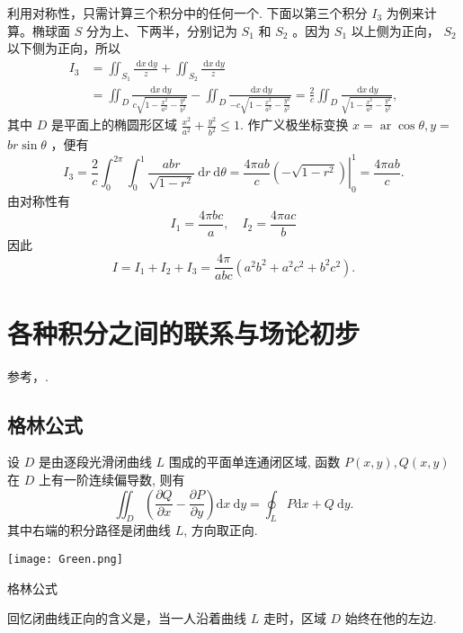 \begin{solution}
    利用对称性，只需计算三个积分中的任何一个. 下面以第三个积分 $I_3$ 为例来计算。椭球面 $S$ 分为上、下两半，分别记为 $S_1$ 和 $S_2$ 。因为 $S_1$ 以上侧为正向， $S_2$ 以下侧为正向，所以
$$
\begin{aligned}
I_3 & =\iint_{S_1} \frac{\mathrm{~d} x \mathrm{~d} y}{z}+\iint_{S_2} \frac{\mathrm{~d} x \mathrm{~d} y}{z} \\
& =\iint_D \frac{\mathrm{~d} x \mathrm{~d} y}{c \sqrt{1-\frac{x^2}{a^2}-\frac{y^2}{b^2}}}-\iint_D \frac{\mathrm{~d} x \mathrm{~d} y}{-c \sqrt{1-\frac{x^2}{a^2}-\frac{y^2}{b^2}}}=\frac{2}{c} \iint_D \frac{\mathrm{~d} x \mathrm{~d} y}{\sqrt{1-\frac{x^2}{a^2}-\frac{y^2}{b^2}}},
\end{aligned}
$$
其中 $D$ 是平面上的椭圆形区域 $\frac{x^2}{a^2}+\frac{y^2}{b^2} \leqslant 1$. 作广义极坐标变换 $x=\operatorname{ar} \cos \theta, y=$ $b r \sin \theta$ ，便有
$$
I_3=\frac{2}{c} \int_0^{2 \pi} \int_0^1 \frac{a b r}{\sqrt{1-r^2}} \mathrm{~d} r \mathrm{~d} \theta=\left.\frac{4 \pi a b}{c}\left(-\sqrt{1-r^2}\right)\right|_0 ^1=\frac{4 \pi a b}{c} .
$$
由对称性有
$$
I_1=\frac{4 \pi b c}{a}, \quad I_2=\frac{4 \pi a c}{b}
$$
因此
$$
I=I_1+I_2+I_3=\frac{4 \pi}{a b c}\left(a^2 b^2+a^2 c^2+b^2 c^2\right) .
$$
\end{solution}

\section{各种积分之间的联系与场论初步}

参考\cite{邓东皋}，\cite{崔尚斌}.

\subsection{格林公式}
\begin{theorem}[\textcolor{green}{格林公式}]\label{格林公式}
设 $D$ 是由逐段光滑闭曲线 $L$ 围成的平面单连通闭区域, 函数 $P(x, y), Q(x, y)$ 在 $D$ 上有一阶连续偏导数, 则有
$$
\iint_D\left(\frac{\partial Q}{\partial x}-\frac{\partial P}{\partial y}\right) \mathrm{d} x \mathrm{~d} y=\oint_L P \mathrm{d} x+Q \mathrm{~d} y .
$$
其中右端的积分路径是闭曲线 $L$, 方向取正向.
\end{theorem}
\begin{marginfigure}
    \centering
    \texttt{[image: Green.png]}
    \caption{格林公式}
    \label{fig:格林公式}
\end{marginfigure}
回忆闭曲线正向的含义是，当一人沿着曲线 $L$ 走时，区域 $D$ 始终在他的左边.

